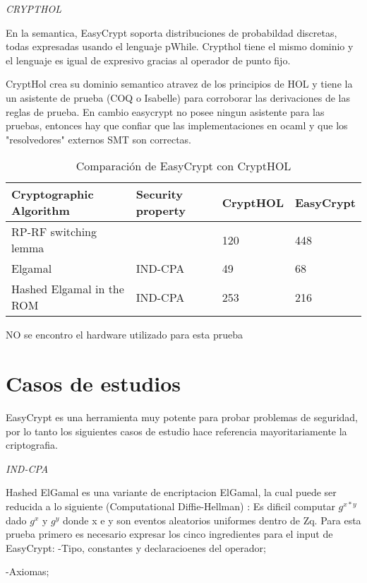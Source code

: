 \documentclass[runningheads,a4paper]{llncs}
\begin{document}
\centerline{\emph{CRYPTHOL}}

En la semantica, EasyCrypt soporta distribuciones de probabildad discretas, todas expresadas usando el lenguaje pWhile. Crypthol tiene el mismo dominio y el lenguaje es igual de expresivo gracias al operador de punto fijo.

CryptHol crea su dominio semantico atravez de los principios de HOL y tiene la un asistente de prueba (COQ o Isabelle) para corroborar las derivaciones de las reglas de prueba. En cambio easycrypt no posee ningun asistente para las pruebas, entonces hay que confiar que las implementaciones en ocaml y que los "resolvedores" externos SMT son correctas.\cite{article8}


\begin{table}
  \caption{Comparación de EasyCrypt con CryptHOL}
  \label{tab:simple2}
  \centering
  \begin{tabular}{ |p{4cm}|p{1.5cm}|p{1.5cm}|p{1.5cm}|  }
 \hline
 Cryptographic Algorithm & Security property & CryptHOL & EasyCrypt\\\cline{1-4}
 \hline
 RP-RF switching lemma &  & 120 & 448\\
 Elgamal & IND-CPA & 49  & 68\\
 Hashed Elgamal in the ROM & IND-CPA & 253 &  216\\
 \hline
\end{tabular}
\end{table}


NO se encontro el hardware utilizado para esta prueba




\section{Casos de estudios}
EasyCrypt es una herramienta muy potente para probar problemas de seguridad, por lo tanto los siguientes casos de estudio hace referencia mayoritariamente la criptografia.

\centerline{\emph{IND-CPA}}

Hashed ElGamal es una variante de encriptacion ElGamal, la cual puede ser reducida a lo siguiente (Computational Diffie-Hellman) : Es dificil computar $g^{x*y}$ dado $g^x$ y $g^y$ donde x e y son eventos aleatorios uniformes dentro de Zq.
Para esta prueba primero es necesario expresar los cinco ingredientes para el input de EasyCrypt:
-Tipo, constantes y declaracioenes del operador;

-Axiomas;
\end{document}
